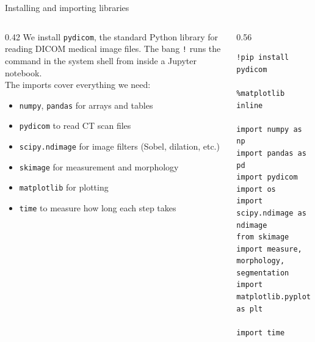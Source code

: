 \documentclass[10pt,aspectratio=169]{beamer}
\renewcommand{\section}[2][]{}
\begin{document}
\begin{frame}[fragile]{Installing and importing libraries}
\begin{columns}[T,onlytextwidth]
\begin{column}{0.42\textwidth}
\small
We install \texttt{pydicom}, the standard Python library for reading DICOM medical image files. The bang \texttt{!} runs the command in the system shell from inside a Jupyter notebook.\\[0.4em]
The imports cover everything we need:
\begin{itemize}
  \item \texttt{numpy}, \texttt{pandas} for arrays and tables
  \item \texttt{pydicom} to read CT scan files
  \item \texttt{scipy.ndimage} for image filters (Sobel, dilation, etc.)
  \item \texttt{skimage} for measurement and morphology
  \item \texttt{matplotlib} for plotting
  \item \texttt{time} to measure how long each step takes
\end{itemize}
\end{column}
\begin{column}{0.56\textwidth}
\begin{lstlisting}[firstnumber=last]
!pip install pydicom

%matplotlib inline

import numpy as np
import pandas as pd
import pydicom
import os
import scipy.ndimage as ndimage
from skimage import measure, morphology, segmentation
import matplotlib.pyplot as plt

import time
\end{lstlisting}
\end{column}
\end{columns}
\end{frame}

\section{Loading patient data}
\end{document}
